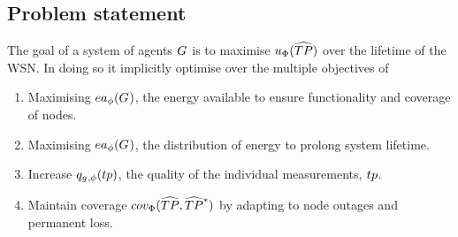 \subsection{Problem statement}

The goal of a system of agents $G_{}^{}$ is to maximise $\functionSystemUtility{}{}$ over the lifetime of the WSN. In doing so it implicitly optimise over the multiple objectives of
\begin{enumerate}
	\item Maximising $\functionEnergyAvailable{}{}$, the energy available to ensure functionality and coverage of nodes.
	\item Maximising $\functionEnergyAvailable{}{}$,  the distribution of energy to prolong system lifetime.
	\item Increase $\functionAtomicTaskQualitySignature{}{}$, the quality of the individual measurements, $\varAtomicTask{}{}$.
	\item Maintain coverage $\functionSystemCoverage{}{}$ by adapting to node outages and permanent loss.
\end{enumerate}